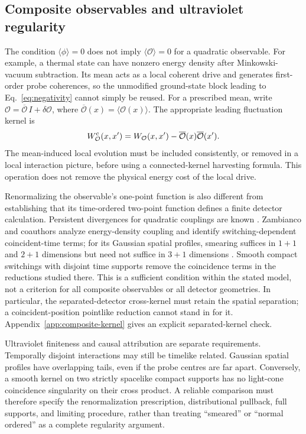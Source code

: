 \documentclass[pdflatex,sn-mathphys-num]{sn-jnl}
\begin{document}
\subsection{Composite observables and ultraviolet regularity}
The condition $\langle\phi\rangle=0$ does not imply $\langle\mathcal O\rangle=0$ for a quadratic observable. For example, a thermal state can have nonzero energy density after Minkowski-vacuum subtraction. Its mean acts as a local coherent drive and generates first-order probe coherences, so the unmodified ground-state block leading to Eq.~\eqref{eq:negativity} cannot simply be reused. For a prescribed mean, write $\mathcal O=\overline{\mathcal O}\,I+\delta\mathcal O$, where $\overline{\mathcal O}(x)=\langle\mathcal O(x)\rangle$. The appropriate leading fluctuation kernel is
\begin{equation}
W_{\mathcal O}^{\rm c}(x,x')=
W_{\mathcal O}(x,x')-\overline{\mathcal O}(x)\overline{\mathcal O}(x').
\label{eq:connected-composite-kernel}
\end{equation}
The mean-induced local evolution must be included consistently, or removed in a local interaction picture, before using a connected-kernel harvesting formula. This operation does not remove the physical energy cost of the local drive.

Renormalizing the observable's one-point function is also different from establishing that its time-ordered two-point function defines a finite detector calculation. Persistent divergences for quadratic couplings are known \cite{SachsMannMartinez2017}. Zambianco and coauthors analyze energy-density coupling and identify switching-dependent coincident-time terms; for its Gaussian spatial profiles, smearing suffices in $1+1$ and $2+1$ dimensions but need not suffice in $3+1$ dimensions \cite{ZambiancoRagulaMartinez2026UV}. Smooth compact switchings with disjoint time supports remove the coincidence terms in the reductions studied there. This is a sufficient condition within the stated model, not a criterion for all composite observables or all detector geometries. In particular, the separated-detector cross-kernel must retain the spatial separation; a coincident-position pointlike reduction cannot stand in for it. Appendix~\ref{app:composite-kernel} gives an explicit separated-kernel check.

Ultraviolet finiteness and causal attribution are separate requirements. Temporally disjoint interactions may still be timelike related. Gaussian spatial profiles have overlapping tails, even if the probe centres are far apart. Conversely, a smooth kernel on two strictly spacelike compact supports has no light-cone coincidence singularity on their cross product. A reliable comparison must therefore specify the renormalization prescription, distributional pullback, full supports, and limiting procedure, rather than treating ``smeared'' or ``normal ordered'' as a complete regularity argument.
\end{document}

